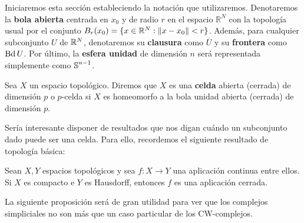 Iniciaremos esta sección estableciendo la notación que utilizaremos. Denotaremos
la \textbf{bola abierta} centrada en $x_{0}$ y de radio $r$ en el espacio
$\mathbb{R}^{N}$ con la topología usual por el conjunto
$B_{r}(x_{0}) = \{ x \in \mathbb{R}^{N} : \| x - x_{0} \| < r \}$. Además, para
cualquier subconjunto $U$ de $\mathbb{R}^{N}$, denotaremos su \textbf{clausura} como
$\overline{U}$ y su \textbf{frontera} como $\operatorname{Bd} U$. Por último, la \textbf{esfera
	unidad} de dimensión $n$ será representada simplemente como $\operatorname{\mathbb{S}}^{n-1}$.

\begin{definicion}
	Sea $X$ un espacio topológico. Diremos que $X$ es una \textbf{celda} abierta (cerrada)
	de dimensión $p$ o $p$-celda si $X$ es homeomorfo a la bola unidad abierta (cerrada)
	de dimensión $p$.
\end{definicion}

Sería interesante disponer de resultados que nos digan cuándo un subconjunto dado
puede ser una celda. Para ello, recordemos el siguiente resultado de topología básica:

\begin{lema}
	\label{lem:closed-map} Sean $X,Y$ espacios topológicos y sea $f : X \to Y$ una
	aplicación continua entre ellos. Si $X$ es compacto e $Y$ es Hausdorff, entonces
	$f$ es una aplicación cerrada.
\end{lema}

La siguiente proposición será de gran utilidad para ver que los complejos
simpliciales no son más que un caso particular de los CW-complejos.

